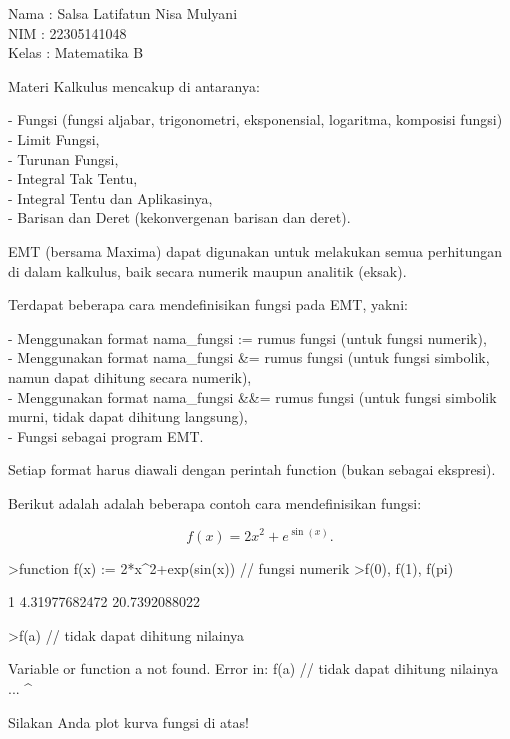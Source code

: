 \documentclass[a4paper,10pt]{article}
\begin{document}
\begin{eulernotebook}
\begin{eulercomment}
Nama : Salsa Latifatun Nisa Mulyani\\
NIM : 22305141048\\
Kelas : Matematika B\\
\end{eulercomment}
\eulersubheading{}
\begin{eulercomment}
Materi Kalkulus mencakup di antaranya:

- Fungsi (fungsi aljabar, trigonometri, eksponensial, logaritma,
komposisi fungsi)\\
- Limit Fungsi,\\
- Turunan Fungsi,\\
- Integral Tak Tentu,\\
- Integral Tentu dan Aplikasinya,\\
- Barisan dan Deret (kekonvergenan barisan dan deret).

EMT (bersama Maxima) dapat digunakan untuk melakukan semua perhitungan
di dalam kalkulus, baik secara numerik maupun analitik (eksak).

\end{eulercomment}
\begin{eulercomment}
Terdapat beberapa cara mendefinisikan fungsi pada EMT, yakni:

- Menggunakan format nama\_fungsi := rumus fungsi (untuk fungsi
numerik),\\
- Menggunakan format nama\_fungsi \&= rumus fungsi (untuk fungsi
simbolik, namun dapat dihitung secara numerik),\\
- Menggunakan format nama\_fungsi \&\&= rumus fungsi (untuk fungsi
simbolik murni, tidak dapat dihitung langsung),\\
- Fungsi sebagai program EMT.

Setiap format harus diawali dengan perintah function (bukan sebagai
ekspresi).

Berikut adalah adalah beberapa contoh cara mendefinisikan fungsi:

\end{eulercomment}
\begin{eulerformula}
\[
f(x)=2x^2+e^{\sin(x)}.
\]
\end{eulerformula}
\begin{eulerprompt}
>function f(x) := 2*x^2+exp(sin(x)) // fungsi numerik
>f(0), f(1), f(pi)
\end{eulerprompt}
\begin{euleroutput}
  1
  4.31977682472
  20.7392088022
\end{euleroutput}
\begin{eulerprompt}
>f(a) // tidak dapat dihitung nilainya
\end{eulerprompt}
\begin{euleroutput}
  Variable or function a not found.
  Error in:
  f(a) // tidak dapat dihitung nilainya ...
     ^
\end{euleroutput}
\begin{eulercomment}
Silakan Anda plot kurva fungsi di atas!


\end{eulercomment}
\end{eulernotebook}
\end{document}
